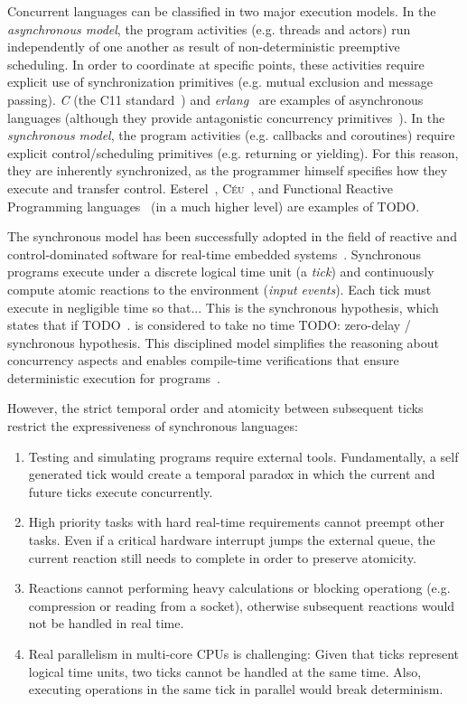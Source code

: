 \documentclass[11pt,a4paper]{article}
\newcommand{\CEU}{\textsc{C\'{e}u}}
\begin{document}
Concurrent languages can be classified in two major execution models.
%
In the \emph{asynchronous model}, the program activities (e.g. threads and 
actors) run independently of one another as result of non-deterministic 
preemptive scheduling.
In order to coordinate at specific points, these activities require explicit 
use of synchronization primitives (e.g. mutual exclusion and message passing).
\emph{C} (the C11 standard~\cite{TODO}) and \emph{erlang}~\cite{TODO} are 
examples of asynchronous languages (although they provide antagonistic 
concurrency primitives~\cite{TODO}).
%
In the \emph{synchronous model}, the program activities (e.g. callbacks and 
coroutines) require explicit control/scheduling primitives (e.g. returning or 
yielding).
For this reason, they are inherently synchronized, as the programmer himself 
specifies how they execute and transfer control.
%
Esterel~\cite{TODO}, \CEU~\cite{TODO}, and Functional Reactive Programming 
languages~\cite{TODO,A,B} (in a much higher level) are examples of TODO.

The synchronous model has been successfully adopted in the field of reactive 
and control-dominated software for real-time embedded systems~\cite{rp.twelve}.
%
Synchronous programs execute under a discrete logical time unit (a \emph{tick}) 
and continuously compute atomic reactions to the environment (\emph{input 
events}).
%
Each tick must execute in negligible time so that...
%
This is the synchronous hypothesis, which states that if TODO~\cite{TODO}.
is considered to take no time
TODO: zero-delay / synchronous hypothesis.
%
This disciplined model simplifies the reasoning about concurrency aspects and 
enables compile-time verifications that ensure deterministic execution for 
programs~\cite{TODO}.

However, the strict temporal order and atomicity between subsequent ticks 
restrict the expressiveness of synchronous languages:
%
\begin{enumerate}
%
\item Testing and simulating programs require external tools.
Fundamentally, a self generated tick would create a temporal paradox in which 
the current and future ticks execute concurrently.
%
\item High priority tasks with hard real-time requirements cannot preempt other 
tasks.
Even if a critical hardware interrupt jumps the external queue, the current 
reaction still needs to complete in order to preserve atomicity.
%
\item Reactions cannot performing heavy calculations or blocking operationg 
(e.g. compression or reading from a socket), otherwise subsequent reactions 
would not be handled in real time.
%
\item Real parallelism in multi-core CPUs is challenging:
Given that ticks represent logical time units, two ticks cannot be handled at 
the same time.
Also, executing operations in the same tick in parallel would break 
determinism.
\end{enumerate}
\end{document}
